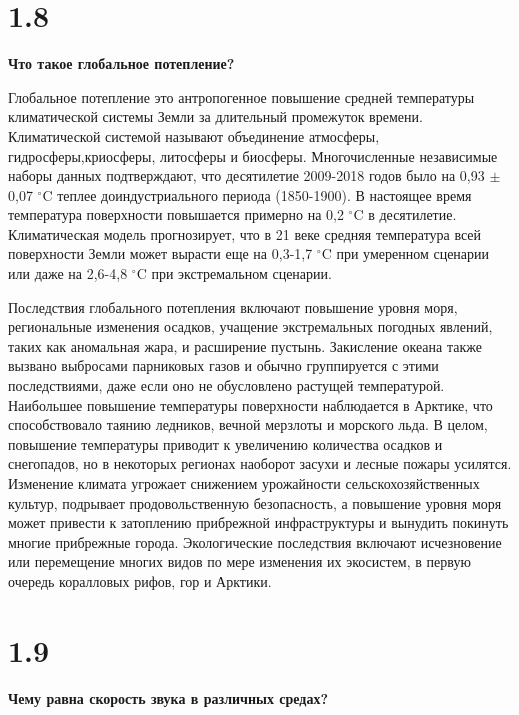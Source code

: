 \documentclass[a4paper,14pt]{article}
\begin{document}
\section*{1.8}

\begin{center}
	\LARGE{\textbf{Что такое глобальное потепление?}}\\
\end{center}

Глобальное потепление это антропогенное повышение средней температуры климатической системы Земли за длительный промежуток времени. Климатической системой называют объединение атмосферы, гидросферы,криосферы, литосферы и биосферы. Многочисленные независимые наборы данных подтверждают, что десятилетие 2009-2018 годов было на 0,93 $\pm$ 0,07 $^\circ$C теплее доиндустриального периода (1850-1900). В настоящее время температура поверхности повышается примерно на 0,2 $^\circ$C в десятилетие. Климатическая модель прогнозирует, что в 21 веке средняя температура всей поверхности Земли может вырасти еще на 0,3-1,7  $^\circ$C при умеренном сценарии или даже на 2,6-4,8  $^\circ$C при экстремальном сценарии.

Последствия глобального потепления включают повышение уровня моря, региональные изменения осадков, учащение экстремальных погодных явлений, таких как аномальная жара, и расширение пустынь. Закисление океана также вызвано выбросами парниковых газов и обычно группируется с этими последствиями, даже если оно не обусловлено растущей температурой. Наибольшее повышение температуры поверхности наблюдается в Арктике, что способствовало таянию ледников, вечной мерзлоты и морского льда. В целом, повышение температуры приводит к увеличению количества осадков и снегопадов, но в некоторых регионах наоборот засухи и лесные пожары усилятся. Изменение климата угрожает снижением урожайности сельскохозяйственных культур, подрывает продовольственную безопасность, а повышение уровня моря может привести к затоплению прибрежной инфраструктуры и вынудить покинуть многие прибрежные города. Экологические последствия включают исчезновение или перемещение многих видов по мере изменения их экосистем, в первую очередь коралловых рифов, гор и Арктики.

\section*{1.9}

\begin{center}
	\LARGE{\textbf{Чему равна скорость звука в различных средах?}}\\
\end{center}
\end{document}
